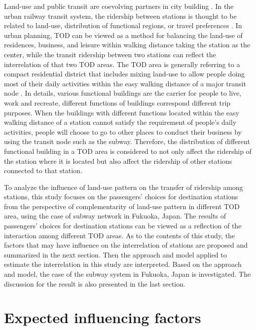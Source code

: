 \documentclass[utf8]{article}
\begin{document}
%
Land-use and public transit are coevolving partners in city building \cite{handy2005smart,dittmar2012new}. In the urban railway transit system, the ridership between stations is thought to be related to land-use, distribution of functional regions, or travel preferences \cite{thompson1997achieving}. In urban planning, TOD can be viewed as a method for balancing the land-use of residences, business, and leisure within walking distance taking the station as the center, while the transit ridership between two stations can reflect the interrelation of that two TOD areas.  The TOD area is generally referring to a compact residential district that includes mixing land-use to allow people doing most of their daily activities within the easy walking distance of a major transit node \cite{lund2004travel}. In details, various functional buildings are the carrier for people to live, work and recreate, different functions of buildings correspond different trip purposes. When the buildings with different functions located within the easy walking distance of a station cannot satisfy the requirement of people’s daily activities, people will choose to go to other places to conduct their business by using the transit node such as the subway. Therefore, the distribution of different functional building in a TOD area is considered to not only affect the ridership of the station where it is located but also affect the ridership of other stations connected to that station.

%
To analyze the influence of land-use pattern on the transfer of ridership among stations, this study focuses on the passengers’ choices for destination stations from the perspective of complementarity of land-use pattern in different TOD area, using the case of subway network in Fukuoka, Japan. The results of passengers' choices for destination stations can be viewed as a reflection of the interaction among different TOD areas. As to the contents of this study, the factors that may have influence on the interrelation of stations are proposed and summarized in the next section. Then the approach and model applied to estimate the interrelation in this study are interpreted. Based on the approach and model, the case of the subway system in Fukuoka, Japan is investigated. The discussion for the result is also presented in the last section.

%

\section{Expected influencing factors}
\end{document}
